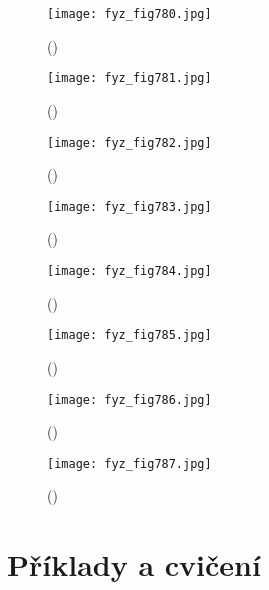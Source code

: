 {    \begin{figure}[ht!] %
      \centering
      \texttt{[image: fyz\_fig780.jpg]}
      \caption{
               (\cite[s.~707]{Feynman02})}
      \label{fyz_fig780}
    \end{figure}

    \begin{figure}[ht!] %
      \centering
      \texttt{[image: fyz\_fig781.jpg]}
      \caption{
               (\cite[s.~707]{Feynman02})}
      \label{fyz_fig781}
    \end{figure}

    \begin{figure}[ht!] %
      \centering
      \texttt{[image: fyz\_fig782.jpg]}
      \caption{
               (\cite[s.~707]{Feynman02})}
      \label{fyz_fig782}
    \end{figure}

    \begin{figure}[ht!] %
      \centering
      \texttt{[image: fyz\_fig783.jpg]}
      \caption{
               (\cite[s.~707]{Feynman02})}
      \label{fyz_fig783}
    \end{figure}

    \begin{figure}[ht!] %
      \centering
      \texttt{[image: fyz\_fig784.jpg]}
      \caption{
               (\cite[s.~707]{Feynman02})}
      \label{fyz_fig784}
    \end{figure}

    \begin{figure}[ht!] %
      \centering
      \texttt{[image: fyz\_fig785.jpg]}
      \caption{
               (\cite[s.~707]{Feynman02})}
      \label{fyz_fig785}
    \end{figure}

    \begin{figure}[ht!] %
      \centering
      \texttt{[image: fyz\_fig786.jpg]}
      \caption{
               (\cite[s.~707]{Feynman02})}
      \label{fyz_fig786}
    \end{figure}

    \begin{figure}[ht!] %
      \centering
      \texttt{[image: fyz\_fig787.jpg]}
      \caption{
               (\cite[s.~707]{Feynman02})}
      \label{fyz_fig787}
    \end{figure}


  \section{Příklady a cvičení}\label{fyz:IIchapXXXsecX}


















} %
\printbibliography[title={Seznam literatury},heading=subbibliography]
